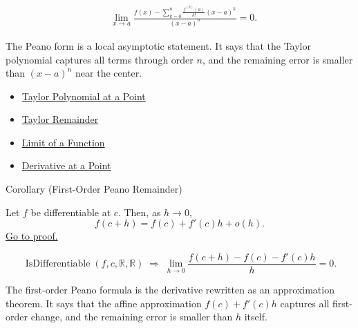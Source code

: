 \begin{remark*}
\[
\begin{aligned}
&\lim_{x\to a}
\frac{
  f(x)-\sum_{k=0}^{n}\frac{f^{(k)}(a)}{k!}(x-a)^k
}{
  (x-a)^n
}
=0.
\end{aligned}
\]
\end{remark*}

\begin{remark*}[Interpretation]
The Peano form is a local asymptotic statement. It says that the Taylor
polynomial captures all terms through order $n$, and the remaining error is
smaller than $(x-a)^n$ near the center.
\end{remark*}

\begin{dependencies}
\begin{itemize}
  \item \hyperref[def:taylor-polynomial-at-a-point]{Taylor Polynomial at a Point}
  \item \hyperref[def:taylor-remainder]{Taylor Remainder}
  \item \hyperref[def:limit-function]{Limit of a Function}
  \item \hyperref[def:derivative-at-a-point]{Derivative at a Point}
\end{itemize}
\end{dependencies}


\begin{corollarybox}{Corollary (First-Order Peano Remainder)}
\begin{corollary}
\label{cor:first-order-peano-remainder}
Let $f$ be differentiable at $c$. Then, as $h\to 0$,
\[
  f(c+h)=f(c)+f'(c)h+o(h).
\]
\hyperref[prf:first-order-peano-remainder]{Go to proof.}
\end{corollary}
\end{corollarybox}

\begin{remark*}
\[
\operatorname{IsDifferentiable}(f,c,\mathbb{R},\mathbb{R})
\;\Rightarrow\;
\lim_{h\to 0}
\frac{f(c+h)-f(c)-f'(c)h}{h}
=0.
\]
\end{remark*}

\begin{remark*}[Interpretation]
The first-order Peano formula is the derivative rewritten as an approximation theorem. It says that the affine approximation $f(c)+f'(c)h$ captures all first-order change, and the remaining error is smaller than $h$ itself.
\end{remark*}

